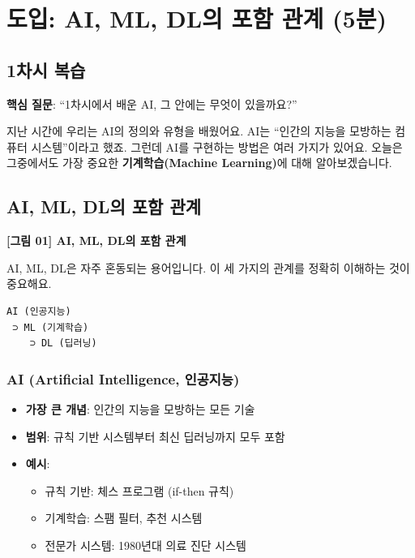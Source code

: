 \documentclass[a4paper, 11pt]{article}
\providecommand{\tightlist}{%
  \setlength{\itemsep}{0pt}\setlength{\parskip}{0pt}}
\renewenvironment{quote}
  {\begin{tcolorbox}[colback=lightblue!30, colframe=mainblue!50,
   left=8pt, right=8pt, top=4pt, bottom=4pt, breakable]}
  {\end{tcolorbox}}
\begin{document}
\hypertarget{uxb3c4uxc785-ai-ml-dluxc758-uxd3ecuxd568-uxad00uxacc4-5uxbd84}{%
\section{ 도입: AI, ML, DL의 포함 관계
(5분)}\label{uxb3c4uxc785-ai-ml-dluxc758-uxd3ecuxd568-uxad00uxacc4-5uxbd84}}

\hypertarget{uxcc28uxc2dc-uxbcf5uxc2b5}{%
\subsection{1차시 복습}\label{uxcc28uxc2dc-uxbcf5uxc2b5}}

\begin{quote}
 \textbf{핵심 질문}: ``1차시에서 배운 AI, 그 안에는 무엇이 있을까요?''
\end{quote}

지난 시간에 우리는 AI의 정의와 유형을 배웠어요. AI는 ``인간의 지능을
모방하는 컴퓨터 시스템''이라고 했죠. 그런데 AI를 구현하는 방법은 여러
가지가 있어요. 오늘은 그중에서도 가장 중요한 \textbf{기계학습(Machine
Learning)}에 대해 알아보겠습니다.

\hypertarget{ai-ml-dluxc758-uxd3ecuxd568-uxad00uxacc4}{%
\subsection{AI, ML, DL의 포함
관계}\label{ai-ml-dluxc758-uxd3ecuxd568-uxad00uxacc4}}

\textbf{{[}그림 01{]} AI, ML, DL의 포함 관계}

AI, ML, DL은 자주 혼동되는 용어입니다. 이 세 가지의 관계를 정확히
이해하는 것이 중요해요.

\begin{verbatim}
AI (인공지능)
 ⊃ ML (기계학습)
    ⊃ DL (딥러닝)
\end{verbatim}

\hypertarget{ai-artificial-intelligence-uxc778uxacf5uxc9c0uxb2a5}{%
\subsubsection{ AI (Artificial Intelligence,
인공지능)}\label{ai-artificial-intelligence-uxc778uxacf5uxc9c0uxb2a5}}

\begin{itemize}
\tightlist
\item
  \textbf{가장 큰 개념}: 인간의 지능을 모방하는 모든 기술
\item
  \textbf{범위}: 규칙 기반 시스템부터 최신 딥러닝까지 모두 포함
\item
  \textbf{예시}:

  \begin{itemize}
  \tightlist
  \item
    규칙 기반: 체스 프로그램 (if-then 규칙)
  \item
    기계학습: 스팸 필터, 추천 시스템
  \item
    전문가 시스템: 1980년대 의료 진단 시스템
  \end{itemize}
\end{itemize}
\end{document}

